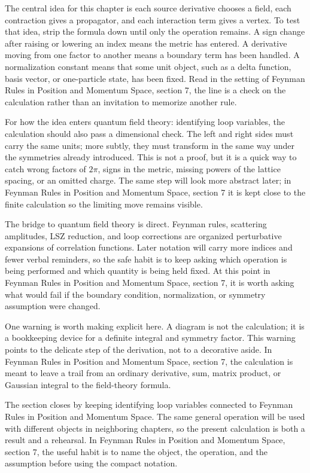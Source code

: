 The central idea for this chapter is each source derivative chooses a field, each contraction gives a propagator, and each interaction term gives a vertex.  To test that idea, strip the formula down until only the operation remains.  A sign change after raising or lowering an index means the metric has entered.  A derivative moving from one factor to another means a boundary term has been handled.  A normalization constant means that some unit object, such as a delta function, basis vector, or one-particle state, has been fixed.  Read in the setting of Feynman Rules in Position and Momentum Space, section 7, the line is a check on the calculation rather than an invitation to memorize another rule.

For how the idea enters quantum field theory: identifying loop variables, the calculation should also pass a dimensional check.  The left and right sides must carry the same units; more subtly, they must transform in the same way under the symmetries already introduced.  This is not a proof, but it is a quick way to catch wrong factors of \(2\pi\), signs in the metric, missing powers of the lattice spacing, or an omitted charge.  The same step will look more abstract later; in Feynman Rules in Position and Momentum Space, section 7 it is kept close to the finite calculation so the limiting move remains visible.

The bridge to quantum field theory is direct.  Feynman rules, scattering amplitudes, LSZ reduction, and loop corrections are organized perturbative expansions of correlation functions.  Later notation will carry more indices and fewer verbal reminders, so the safe habit is to keep asking which operation is being performed and which quantity is being held fixed.  At this point in Feynman Rules in Position and Momentum Space, section 7, it is worth asking what would fail if the boundary condition, normalization, or symmetry assumption were changed.

One warning is worth making explicit here.  A diagram is not the calculation; it is a bookkeeping device for a definite integral and symmetry factor.  This warning points to the delicate step of the derivation, not to a decorative aside.  In Feynman Rules in Position and Momentum Space, section 7, the calculation is meant to leave a trail from an ordinary derivative, sum, matrix product, or Gaussian integral to the field-theory formula.

The section closes by keeping identifying loop variables connected to Feynman Rules in Position and Momentum Space.  The same general operation will be used with different objects in neighboring chapters, so the present calculation is both a result and a rehearsal.  In Feynman Rules in Position and Momentum Space, section 7, the useful habit is to name the object, the operation, and the assumption before using the compact notation.



